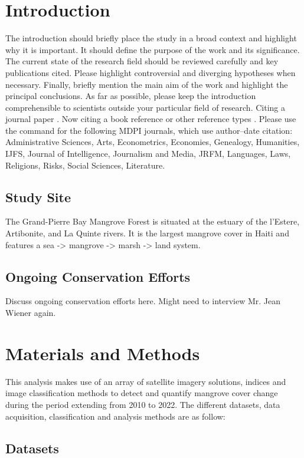\documentclass[journal,article,submit,pdftex,moreauthors]{Definitions/mdpi}
\begin{document}
\section{Introduction}

The introduction should briefly place the study in a broad context and highlight why it is important. It should define the purpose of the work and its significance. The current state of the research field should be reviewed carefully and key publications cited. Please highlight controversial and diverging hypotheses when necessary. Finally, briefly mention the main aim of the work and highlight the principal conclusions. As far as possible, please keep the introduction comprehensible to scientists outside your particular field of research. Citing a journal paper \cite{ref-journal}. Now citing a book reference \cite{ref-book1,ref-book2} or other reference types \cite{ref-unpublish,ref-communication,ref-proceeding}. Please use the command \citep{ref-thesis,ref-url} for the following MDPI journals, which use author--date citation: Administrative Sciences, Arts, Econometrics, Economies, Genealogy, Humanities, IJFS, Journal of Intelligence, Journalism and Media, JRFM, Languages, Laws, Religions, Risks, Social Sciences, Literature.

\subsection{Study Site}
The Grand-Pierre Bay Mangrove Forest is situated at the estuary of the l’Estere, Artibonite, and La Quinte rivers. It is the largest mangrove cover in Haiti and features a sea -> mangrove -> marsh -> land system.
\subsection{Ongoing Conservation Efforts}
Discuss ongoing conservation efforts here. Might need to interview Mr. Jean Wiener again.
\section{Materials and Methods}
This analysis makes use of an array of satellite imagery solutions, indices and image classification methods to detect and quantify mangrove cover change during the period extending from 2010 to 2022. The different datasets, data acquisition, classification and analysis methods are as follow:

\subsection{Datasets}
\end{document}
